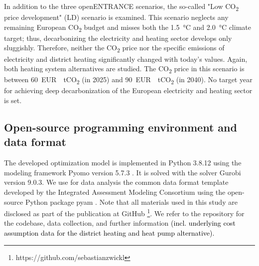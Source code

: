 In addition to the three openENTRANCE scenarios, the so-called "Low CO\textsubscript{2} price development" (LD) scenario is examined. This scenario neglects any remaining European CO\textsubscript{2} budget and misses both the  \SI{1.5}{\degreeCelsius} and \SI{2.0}{\degreeCelsius} climate target; thus, decarbonizing the electricity and heating sector develops only sluggishly. Therefore, neither the CO\textsubscript{2} price nor the specific emissions of electricity and district heating significantly changed with today's values. Again, both heating system alternatives are studied. The CO\textsubscript{2} price in this scenario is between \SI{60}{EUR \per tCO_{2}} (in 2025) and \SI{90}{EUR \per tCO_{2}} (in 2040). No target year for achieving deep decarbonization of the European electricity and heating sector is set. 

\subsection{Open-source programming environment and data format}\label{met:os}
The developed optimization model is implemented in Python 3.8.12 using the modeling framework Pyomo version 5.7.3 \cite{hart2017optimization}. It is solved with the solver Gurobi version 9.0.3. We use for data analysis the common data format template developed by the Integrated Assessment Modeling Consortium using the open-source Python package pyam \cite{huppmann2021pyam}. Note that all materials used in this study are disclosed as part of the publication at GitHub \footnote{https://github.com/sebastianzwickl}. We refer to the repository \textcolor{black}{\cite{zwickl}} for the codebase, data collection, and further information \textcolor{black}{(incl. underlying cost assumption data for the district heating and heat pump alternative).}